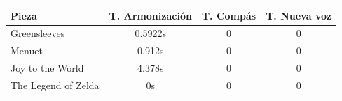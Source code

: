   \begin{center}
  	\begin{tabular}{ | l | c | c | c | }
  		\hline
  		Pieza & T. Armonización & T. Compás & T. Nueva voz \\ \hline \hline
  		Greensleeves & 0.5922s & 0 & 0 \\ \hline
  		Menuet & 0.912s & 0 & 0 \\ \hline
  		Joy to the World & 4.378s & 0 & 0 \\ \hline
  		The Legend of Zelda & 0s & 0 & 0 \\ \hline
  	\end{tabular}
  \end{center}
  
  

